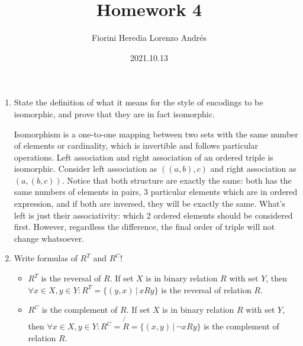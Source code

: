 \documentclass[12pt]{article}
\begin{document}
\title{\textbf{Homework 4}}
\author{Fiorini Heredia Lorenzo Andrés}
\date{2021.10.13}
\maketitle
{}

\begin{enumerate}

\item {\large State the definition of what it means for the style of encodings to be isomorphic, and prove that they are in fact isomorphic.}
	
	 Isomorphism is a one-to-one mapping between two sets with the same number of elements or cardinality, which is invertible and follows particular operations. Left association and right association of an ordered triple is isomorphic. Consider left association as $((a,b),c)$ and right association as $(a,(b,c))$. Notice that both structure are exactly the same: both has the same numbers of elements in pairs, 3 particular elements which are in ordered expression, and if both are inversed, they will be exactly the same.  What's left is just their associativity: which 2 ordered elements should be considered first. However, regardless the difference, the final order of triple will not change whatsoever. \\


\item {\large Write formulas of $R^T$ and $R^C$!}
\begin{itemize}
	\item $R^T$ is the reversal of $R$. If set $X$ is in binary relation $R$ with set $Y$, then $\forall x\in X, y\in Y: R^T=\{(y, x) \,|\, xRy\}$ is the reversal of relation $R$.
	\item $R^C$ is the complement of $R$.  If set $X$ is in binary relation $R$ with set $Y$, then $\forall x\in X, y\in Y: R^C=\not{R}=\{(x,y) \,|\, \neg xRy\}$ is the complement of relation $R$.\\
\end{itemize}



\end{enumerate}
\end{document}
